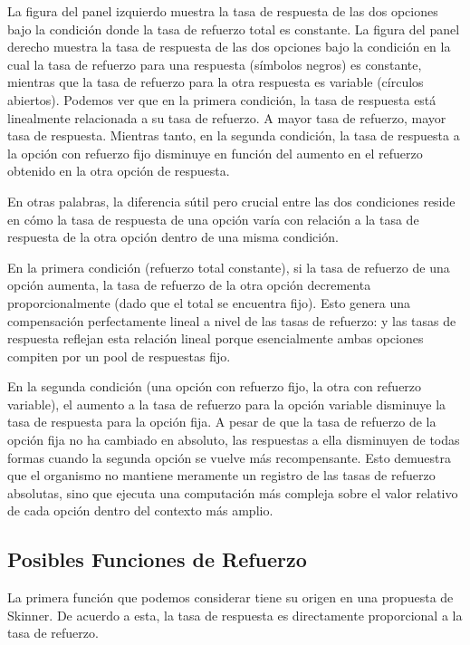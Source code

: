 \documentclass[
  letterpaper,
]{book}
\begin{document}
La figura del panel izquierdo muestra la tasa de respuesta de las dos
opciones bajo la condición donde la tasa de refuerzo total es constante.
La figura del panel derecho muestra la tasa de respuesta de las dos
opciones bajo la condición en la cual la tasa de refuerzo para una
respuesta (símbolos negros) es constante, mientras que la tasa de
refuerzo para la otra respuesta es variable (círculos abiertos). Podemos
ver que en la primera condición, la tasa de respuesta está linealmente
relacionada a su tasa de refuerzo. A mayor tasa de refuerzo, mayor tasa
de respuesta. Mientras tanto, en la segunda condición, la tasa de
respuesta a la opción con refuerzo fijo disminuye en función del aumento
en el refuerzo obtenido en la otra opción de respuesta.

En otras palabras, la diferencia sútil pero crucial entre las dos
condiciones reside en cómo la tasa de respuesta de una opción varía con
relación a la tasa de respuesta de la otra opción dentro de una misma
condición.

En la primera condición (refuerzo total constante), si la tasa de
refuerzo de una opción aumenta, la tasa de refuerzo de la otra opción
decrementa proporcionalmente (dado que el total se encuentra fijo). Esto
genera una compensación perfectamente lineal a nivel de las tasas de
refuerzo: y las tasas de respuesta reflejan esta relación lineal porque
esencialmente ambas opciones compiten por un pool de respuestas fijo.

En la segunda condición (una opción con refuerzo fijo, la otra con
refuerzo variable), el aumento a la tasa de refuerzo para la opción
variable disminuye la tasa de respuesta para la opción fija. A pesar de
que la tasa de refuerzo de la opción fija no ha cambiado en absoluto,
las respuestas a ella disminuyen de todas formas cuando la segunda
opción se vuelve más recompensante. Esto demuestra que el organismo no
mantiene meramente un registro de las tasas de refuerzo absolutas, sino
que ejecuta una computación más compleja sobre el valor relativo de cada
opción dentro del contexto más amplio.

\subsection{Posibles Funciones de
Refuerzo}\label{posibles-funciones-de-refuerzo}

La primera función que podemos considerar tiene su origen en una
propuesta de Skinner. De acuerdo a esta, la tasa de respuesta es
directamente proporcional a la tasa de refuerzo.
\end{document}
